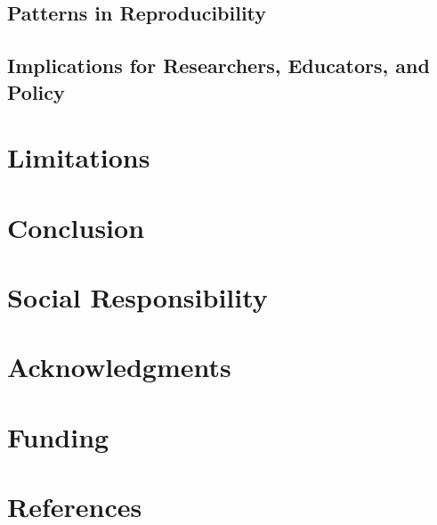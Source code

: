 \documentclass[
  11pt,
  a4paper,
]{article}
\newlength{\cslhangindent}
\newenvironment{CSLReferences}[2] %
 {\begin{list}{}{%
  \setlength{\itemindent}{0pt}
  \setlength{\leftmargin}{0pt}
  \setlength{\parsep}{0pt}
  \ifodd #1
   \setlength{\leftmargin}{\cslhangindent}
   \setlength{\itemindent}{-1\cslhangindent}
  \fi
  \setlength{\itemsep}{#2\baselineskip}}}
 {\end{list}}
\begin{document}
\subsection{Patterns in
Reproducibility}\label{patterns-in-reproducibility}

\subsection{Implications for Researchers, Educators, and
Policy}\label{implications-for-researchers-educators-and-policy}

\section{Limitations}\label{sec-limitations}

\section{Conclusion}\label{sec-conclusion}

\section*{Social Responsibility}\label{sec-social-responsibility}

\section*{Acknowledgments}\label{sec-acknowledgments}

\section*{Funding}\label{sec-funding}

\section*{References}\label{sec-references}

\label{refs}
\begin{CSLReferences}{0}{1}
\end{CSLReferences}
\end{document}

